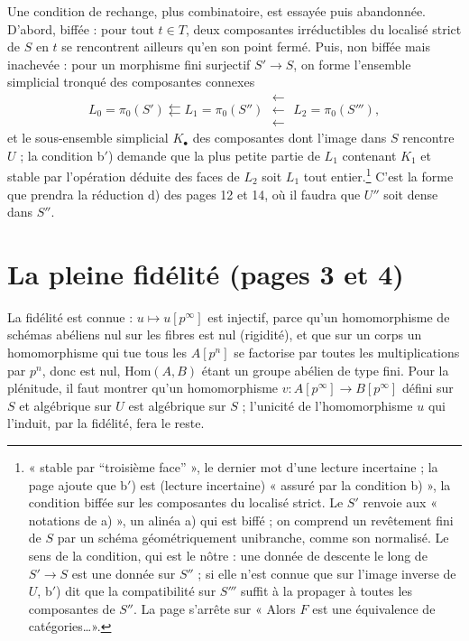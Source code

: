 \documentclass[11pt,a4paper]{article}
\begin{document}
Une condition de rechange, plus combinatoire, est essayée puis abandonnée.
D'abord, biffée : pour tout $t \in T$, deux composantes irréductibles du
localisé strict de $S$ en $t$ se rencontrent ailleurs qu'en son point fermé.
Puis, non biffée mais inachevée : pour un morphisme fini surjectif
$S' \to S$, on forme l'ensemble simplicial tronqué des composantes connexes
\[
  L_0 = \pi_0(S') \leftleftarrows L_1 = \pi_0(S'')
  \;\substack{\leftarrow\\[-2pt]\leftarrow\\[-2pt]\leftarrow}\;
  L_2 = \pi_0(S'''),
\]
et le sous-ensemble simplicial $K_\bullet$ des composantes dont l'image dans
$S$ rencontre $U$ ; la condition b$'$) demande que la plus petite partie de
$L_1$ contenant $K_1$ et stable par l'opération déduite des faces de $L_2$ soit
$L_1$ tout entier.\footnote{« stable par “troisième face” », le dernier mot
d'une lecture incertaine ; la page ajoute que b$'$) est (lecture incertaine)
« assuré par la condition b) », la condition biffée sur les composantes du
localisé strict. Le $S'$ renvoie aux « notations de a) », un alinéa a) qui est
biffé ; on comprend un revêtement fini de $S$ par un schéma géométriquement
unibranche, comme son normalisé. Le sens de la condition, qui est le nôtre :
une donnée de descente le long de $S' \to S$ est une donnée sur $S''$ ; si
elle n'est connue que sur l'image inverse de $U$, b$'$) dit que la
compatibilité sur $S'''$ suffit à la propager à toutes les composantes de
$S''$. La page s'arrête sur « Alors $F$ est une équivalence de
catégories\ldots ».}
C'est la forme que prendra la réduction d) des pages 12 et 14, où il faudra
que $U''$ soit dense dans $S''$.

\section*{La pleine fidélité (pages 3 et 4)}

La fidélité est connue : $u \mapsto u[p^\infty]$ est injectif, parce qu'un
homomorphisme de schémas abéliens nul sur les fibres est nul (rigidité), et
que sur un corps un homomorphisme qui tue tous les $A[p^n]$ se factorise par
toutes les multiplications par $p^n$, donc est nul, $\mathrm{Hom}(A,B)$ étant
un groupe abélien de type fini. Pour la plénitude, il faut montrer qu'un
homomorphisme $v : A[p^\infty] \to B[p^\infty]$ défini sur $S$ et algébrique
sur $U$ est algébrique sur $S$ ; l'unicité de l'homomorphisme $u$ qui
l'induit, par la fidélité, fera le reste.
\end{document}
